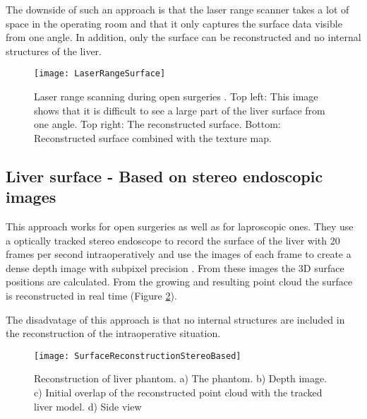 The downside of such an approach is that the laser range scanner takes a lot of
space in the operating room and that it only captures the surface data visible
from one angle. In addition, only the surface can be reconstructed and no
internal structures of the liver.
\begin{figure}[H]
  \centering
 \texttt{[image: LaserRangeSurface]}
 \caption{Laser range scanning during open surgeries \cite{cash2007concepts}.
   Top left: This image shows that it is difficult to see a large part of the liver
   surface from one angle. Top right: The reconstructed surface. Bottom:
   Reconstructed surface combined with the texture map. }
  \label{fig:LaserRangeSurface}
\end{figure}

\subsection{Liver surface - Based on stereo endoscopic images}
This approach works for open surgeries as well as for laproscopic ones. They use
a optically tracked stereo endoscope to record the surface of the liver with 20 frames per second intraoperatively and use
the images of each frame to create a dense depth image with subpixel precision \cite{speidel2011intraoperative}.
From these images the 3D surface positions are calculated. From the growing and resulting
point cloud the surface is reconstructed in real time (Figure \ref{fig:SurfaceReconstructionStereoBased}).

The disadvatage of this approach is that no internal structures are included in
the reconstruction of the intraoperative situation.
\begin{figure}[H]
  \centering
 \texttt{[image: SurfaceReconstructionStereoBased]}
 \caption{Reconstruction of liver phantom. a) The phantom. b) Depth image. c)
   Initial overlap of the reconstructed point cloud with the tracked liver
   model. d) Side view \cite{speidel2011intraoperative}}
  \label{fig:SurfaceReconstructionStereoBased}
\end{figure}

